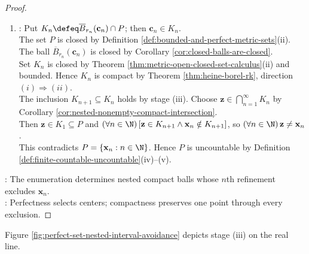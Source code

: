 \begin{theorem}
\begin{proof}
\begin{enumerate}[label=(\roman*)]
Thus $\overline{B}_{r_{n+1}}(\mathbf{c}_{n+1})\subseteq B_{r_n}(\mathbf{c}_n)$. Hence $\norm{\mathbf{x}_n-\mathbf{c}_{n+1}}_2=\norm{\mathbf{x}_n-\mathbf{y}_n}_2\geq\delta_n=2r_{n+1}>r_{n+1}$, so $\mathbf{x}_n\notin\overline{B}_{r_{n+1}}(\mathbf{c}_{n+1})$.
\item {}: Put $K_n\defeq\overline{B}_{r_n}(\mathbf{c}_n)\cap P$; then $\mathbf{c}_n\in K_n$.\\
The set $P$ is closed by Definition \ref{def:bounded-and-perfect-metric-sets}(ii). The ball $\overline{B}_{r_n}(\mathbf{c}_n)$ is closed by Corollary \ref{cor:closed-balls-are-closed}.\\
Set $K_n$ is closed by Theorem \ref{thm:metric-open-closed-set-calculus}(ii) and bounded. Hence $K_n$ is compact by Theorem \ref{thm:heine-borel-rk}, direction $(i)\Rightarrow(ii)$.\\
The inclusion $K_{n+1}\subseteq K_n$ holds by stage (iii). Choose $\mathbf{z}\in\bigcap\limits_{n=1}^{\infty}K_n$ by Corollary \ref{cor:nested-nonempty-compact-intersection}.\\
Then $\mathbf{z}\in K_1\subseteq P$ and $(\forall n\in\N)\,[\mathbf{z}\in K_{n+1}\land\mathbf{x}_n\notin K_{n+1}]$, so $(\forall n\in\N)\,\mathbf{z}\neq\mathbf{x}_n$.\\
This contradicts $P=\{\mathbf{x}_n:n\in\N\}$. Hence $P$ is uncountable by Definition \ref{def:finite-countable-uncountable}(iv)--(v).
\end{enumerate}
: The enumeration determines nested compact balls whose $n$th refinement excludes $\mathbf{x}_n$.\\
: Perfectness selects centers; compactness preserves one point through every exclusion.
\end{proof}
\end{theorem}

Figure \ref{fig:perfect-set-nested-interval-avoidance} depicts stage (iii) on the real line.
\begin{illustrationfigure}[H]
  \centering
  
  \caption{A closed interval $I_2\subseteq I_1$ centered at $y_1\in P$ avoids $x_1$.}
  \label{fig:perfect-set-nested-interval-avoidance}
\end{illustrationfigure}

